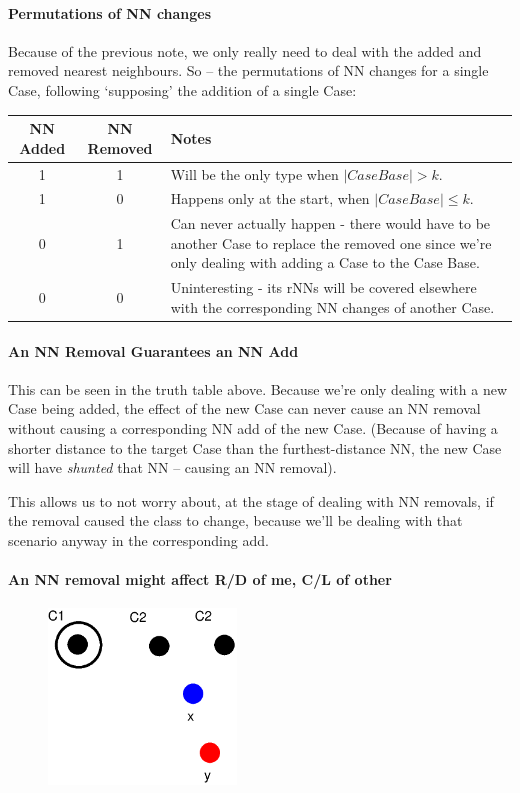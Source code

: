 \documentclass[a4paper,11pt]{report}
\begin{document}
\begin{samepage}
\paragraph{Permutations of NN changes}
Because of the previous note, we only really need to deal with the added and removed nearest neighbours. So – the permutations of NN changes for a single Case, following `supposing' the addition of a single Case:

\begin{tabular}{ | c | c | p{6cm} |} \hline
	NN Added & NN Removed & Notes \\ \hline
	1 & 1 & Will be the only type when $\left|CaseBase\right|> k$. \\ \hline
	1 & 0 & Happens only at the start, when $\left|CaseBase\right|\leq k$. \\ \hline
	0 & 1 & Can never actually happen - there would have to be another Case to replace the removed one since we're only dealing with adding a Case to the Case Base. \\ \hline
	0 & 0 & Uninteresting - its rNNs will be covered elsewhere with the corresponding NN changes of another Case. \\ \hline
\end{tabular}

\end{samepage}

\paragraph{An NN Removal Guarantees an NN Add}
This can be seen in the truth table above. Because we're only dealing with a new Case being added, the effect of the new Case can never cause an NN removal without causing a corresponding NN add of the new Case. (Because of having a shorter distance to the target Case than the furthest-distance NN, the new Case will have \emph{shunted} that NN – causing an NN removal).

This allows us to not worry about, at the stage of dealing with NN removals, if the removal caused the class to change, because we'll be dealing with that scenario anyway in the corresponding add.

\paragraph{An NN removal might affect R/D of me, C/L of other}

\begin{figure}[h!]
\includegraphics[width=5cm]{./Drawn/NnMightAffectEg}
\end{figure}
\end{document}
